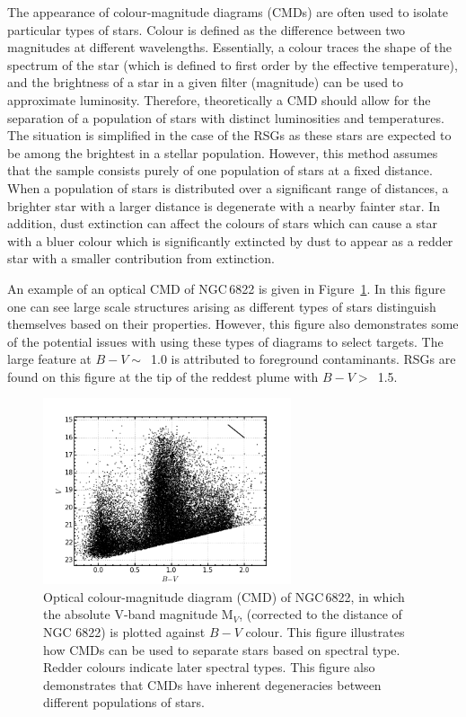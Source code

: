 The appearance of colour-magnitude diagrams (CMDs) are often used to isolate particular types of stars.
Colour is defined as the difference between two magnitudes at different wavelengths.
Essentially, a colour traces the shape of the spectrum of the star (which is defined to first order by the effective temperature), and the brightness of a star in a given filter (magnitude) can be used to approximate luminosity.
Therefore, theoretically a CMD should allow for the separation of a population of stars with distinct luminosities and temperatures.
The situation is simplified in the case of the RSGs as these stars are expected to be among the brightest in a stellar population.
However, this method assumes that the sample consists purely of one population of stars at a fixed distance.
When a population of stars is distributed over a significant range of distances, a brighter star with a larger distance is degenerate with a nearby fainter star.
In addition, dust extinction can affect the colours of stars which can cause a star with a bluer colour which is significantly extincted by dust to appear as a redder star with a smaller contribution from extinction.

An example of an optical CMD of NGC\,6822 is given in Figure~\ref{fig:CMD}.
In this figure one can see large scale structures arising as different types of stars distinguish themselves based on their properties.
However, this figure also demonstrates some of the potential issues with using these types of diagrams to select targets.
The large feature at $B-V \sim$~1.0 is attributed to foreground contaminants.
RSGs are found on this figure at the tip of the reddest plume with $B-V >$~1.5.

\begin{figure}
 \centering
 \includegraphics[width=0.65\textwidth]{intro/NGC6822_bv_CMD}
 \caption[Optical colour-magnitude diagram of NGC\,6822]{Optical colour-magnitude diagram (CMD) of NGC\,6822, in which the absolute V-band magnitude M$_{V}$, (corrected to the distance of NGC 6822) is plotted against $B-V$ colour.
This figure illustrates how CMDs can be used to separate stars based on spectral type. Redder colours indicate later spectral types.
This figure also demonstrates that CMDs have inherent degeneracies between different populations of stars.
 \label{fig:CMD}}
\end{figure}

